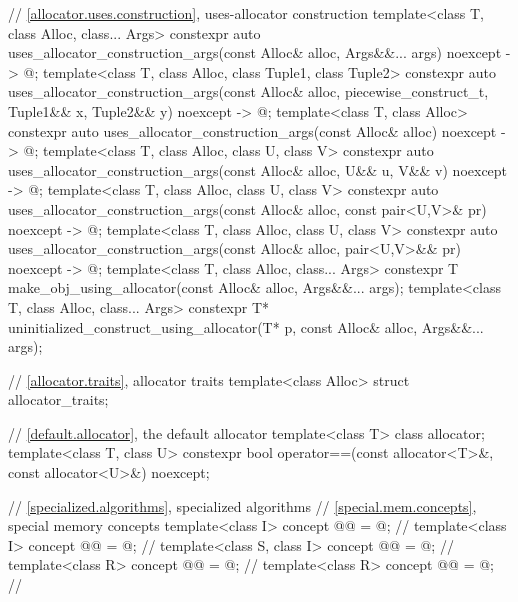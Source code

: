 \begin{codeblock}
{  // \ref{allocator.uses.construction}, uses-allocator construction
  template<class T, class Alloc, class... Args>
    constexpr auto uses_allocator_construction_args(const Alloc& alloc,
                                                    Args&&... args) noexcept -> @\seebelow@;
  template<class T, class Alloc, class Tuple1, class Tuple2>
    constexpr auto uses_allocator_construction_args(const Alloc& alloc, piecewise_construct_t,
                                                    Tuple1&& x, Tuple2&& y)
                                                    noexcept ->  @\seebelow@;
  template<class T, class Alloc>
    constexpr auto uses_allocator_construction_args(const Alloc& alloc) noexcept -> @\seebelow@;
  template<class T, class Alloc, class U, class V>
    constexpr auto uses_allocator_construction_args(const Alloc& alloc,
                                                    U&& u, V&& v) noexcept -> @\seebelow@;
  template<class T, class Alloc, class U, class V>
    constexpr auto uses_allocator_construction_args(const Alloc& alloc,
                                                    const pair<U,V>& pr) noexcept -> @\seebelow@;
  template<class T, class Alloc, class U, class V>
    constexpr auto uses_allocator_construction_args(const Alloc& alloc,
                                                    pair<U,V>&& pr) noexcept -> @\seebelow@;
  template<class T, class Alloc, class... Args>
    constexpr T make_obj_using_allocator(const Alloc& alloc, Args&&... args);
  template<class T, class Alloc, class... Args>
    constexpr T* uninitialized_construct_using_allocator(T* p, const Alloc& alloc,
                                                         Args&&... args);

  // \ref{allocator.traits}, allocator traits
  template<class Alloc> struct allocator_traits;

  // \ref{default.allocator}, the default allocator
  template<class T> class allocator;
  template<class T, class U>
    constexpr bool operator==(const allocator<T>&, const allocator<U>&) noexcept;

  // \ref{specialized.algorithms}, specialized algorithms
  // \ref{special.mem.concepts}, special memory concepts
  template<class I>
    concept @@ = @\seebelow@;    // \expos
  template<class I>
    concept @@ = @\seebelow@;  // \expos
  template<class S, class I>
    concept @@ = @\seebelow@;          // \expos
  template<class R>
    concept @@ = @\seebelow@;       // \expos
  template<class R>
    concept @@ = @\seebelow@;     // \expos

}
\end{codeblock}
